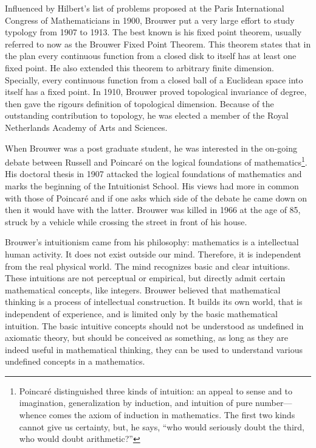 \documentclass{article}
\begin{document}
Influenced by Hilbert's list of problems proposed at the Paris International Congress of Mathematicians in 1900, Brouwer put a very large effort to study typology from 1907 to 1913. The best known is his fixed point theorem, usually referred to now as the Brouwer Fixed Point Theorem. This theorem states that in the plan every continuous function from a closed disk to itself has at least one fixed point. He also extended this theorem to arbitrary finite dimension. Specially, every continuous function from a closed ball of a Euclidean space into itself has a fixed point. In 1910, Brouwer proved topological invariance of degree, then gave the rigours definition of topological dimension. Because of the outstanding contribution to topology, he was elected a member of the Royal Netherlands Academy of Arts and Sciences.

When Brouwer was a post graduate student, he was interested in the on-going debate between Russell and Poincaré on the logical foundations of mathematics\footnote{Poincaré distinguished three kinds of intuition: an appeal to sense and to imagination, generalization by induction, and intuition of pure number—whence comes the axiom of induction in mathematics. The first two kinds cannot give us certainty, but, he says, ``who would seriously doubt the third, who would doubt arithmetic?''\cite{Poincare2}}. His doctoral thesis in 1907 attacked the logical foundations of mathematics and marks the beginning of the Intuitionist School. His views had more in common with those of Poincaré and if one asks which side of the debate he came down on then it would have with the latter. Brouwer was killed in 1966 at the age of 85, struck by a vehicle while crossing the street in front of his house.

Brouwer's intuitionism came from his philosophy: mathematics is a intellectual human activity. It does not exist outside our mind. Therefore, it is independent from the real physical world. The mind recognizes basic and clear intuitions. These intuitions are not perceptual or empirical, but directly admit certain mathematical concepts, like integers. Brouwer believed that mathematical thinking is a process of intellectual construction. It builds its own world, that is independent of experience, and is limited only by the basic mathematical intuition. The basic intuitive concepts should not be understood as undefined in axiomatic theory, but should be conceived as something, as long as they are indeed useful in mathematical thinking, they can be used to understand various undefined concepts in a mathematics.
\end{document}
